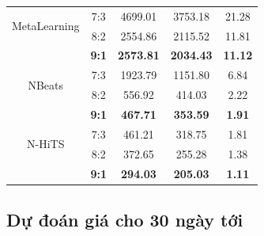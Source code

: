 \begin{table}[H]
\begin{tabular}{|c|c|c|c|c|}
         \hline
         \multirow{2}{*}{MetaLearning} & 7:3 & 4699.01&3753.18&21.28\\ & 8:2 & 2554.86&2115.52&11.81 \\ & \textbf{9:1} & \textbf{2573.81} & \textbf{2034.43} & \textbf{11.12}\\
         \hline
         \multirow{2}{*}{NBeats} & 7:3 & 1923.79&1151.80&6.84\\ & 8:2 & 556.92&414.03&2.22 \\ & \textbf{9:1} & \textbf{467.71} & \textbf{353.59} & \textbf{1.91}\\
         \hline
         \multirow{2}{*}{N-HiTS} & 7:3 & 461.21&318.75&1.81\\ & 8:2 & 372.65&255.28&1.38 \\ & \textbf{9:1} & \textbf{294.03} & \textbf{205.03} & \textbf{1.11}\\
         \hline
    \end{tabular}
    \label{eibresult}
\end{table}


\subsection{Dự đoán giá cho 30 ngày tới} 
